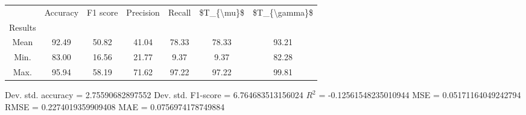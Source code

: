 \begin{tabular}{|c|c|c|c|c|c|c|}
\toprule
{} &  Accuracy &  F1 score &  Precision &  Recall &  \$T\_\{\textbackslash mu\}\$ &  \$T\_\{\textbackslash gamma\}\$ \\
Results &           &           &            &         &            &               \\
\hline
Mean    &     92.49 &     50.82 &      41.04 &   78.33 &      78.33 &         93.21 \\
Min.    &     83.00 &     16.56 &      21.77 &    9.37 &       9.37 &         82.28 \\
Max.    &     95.94 &     58.19 &      71.62 &   97.22 &      97.22 &         99.81 \\
\bottomrule
\end{tabular}

 Dev. std. accuracy = 2.75590682897552
 Dev. std. F1-score = 6.764683513156024
 $R^2$ = -0.12561548235010944
 MSE = 0.05171164049242794
 RMSE = 0.2274019359909408
 MAE = 0.0756974178749884